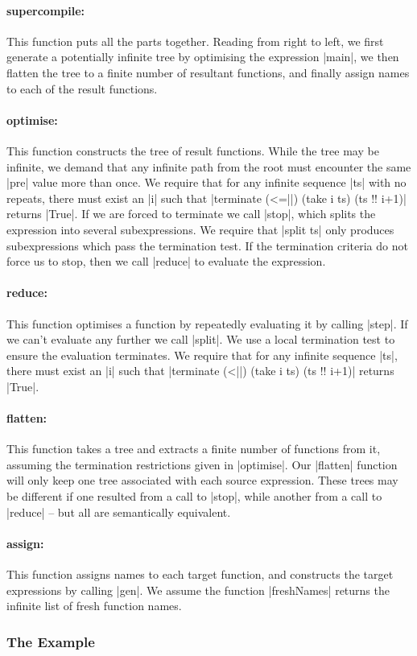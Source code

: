 \documentclass[draft]{sigplanconf}
\begin{document}

\newcommand{\function}[1]{\paragraph{\textsf{#1:}}\hspace{-3mm}}

\function{supercompile} This function puts all the parts together. Reading from right to left, we first generate a potentially infinite tree by optimising the expression |main|, we then flatten the tree to a finite number of resultant functions, and finally assign names to each of the result functions.

\function{optimise} This function constructs the tree of result functions. While the tree may be infinite, we demand that any infinite path from the root must encounter the same |pre| value more than once. We require that for any infinite sequence |ts| with no repeats, there must exist an |i| such that |terminate (<=||) (take i ts) (ts !! i+1)| returns |True|. If we are forced to terminate we call |stop|, which splits the expression into several subexpressions. We require that |split ts| only produces subexpressions which pass the termination test. If the termination criteria do not force us to stop, then we call |reduce| to evaluate the expression.

\function{reduce} This function optimises a function by repeatedly evaluating it by calling |step|. If we can't evaluate any further we call |split|. We use a local termination test to ensure the evaluation terminates. We require that for any infinite sequence |ts|, there must exist an |i| such that |terminate (<||) (take i ts) (ts !! i+1)| returns |True|.

\function{flatten} This function takes a tree and extracts a finite number of functions from it, assuming the termination restrictions given in |optimise|. Our |flatten| function will only keep one tree associated with each source expression. These trees may be different if one resulted from a call to |stop|, while another from a call to |reduce| -- but all are semantically equivalent.

\function{assign} This function assigns names to each target function, and constructs the target expressions by calling |gen|. We assume the function |freshNames| returns the infinite list of fresh function names.

\subsubsection{The Example}
\label{sec:manager_example}
\end{document}
